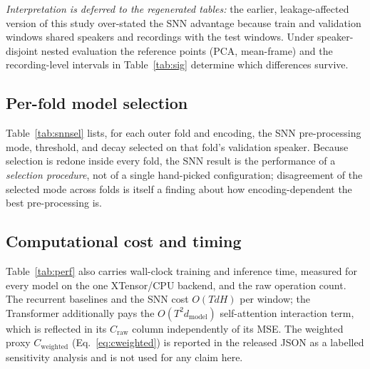\documentclass[conference]{IEEEtran}
\begin{document}
\par \emph{Interpretation is deferred to the regenerated tables:} the earlier,
leakage-affected version of this study over-stated the SNN advantage because
train and validation windows shared speakers and recordings with the test
windows. Under speaker-disjoint nested evaluation the reference points (PCA,
mean-frame) and the recording-level intervals in Table~\ref{tab:sig} determine
which differences survive.

\subsection{Per-fold model selection}
\par Table~\ref{tab:snnsel} lists, for each outer fold and encoding, the SNN
pre-processing mode, threshold, and decay selected on that fold's validation
speaker. Because selection is redone inside every fold, the SNN result is the
performance of a \emph{selection procedure}, not of a single hand-picked
configuration; disagreement of the selected mode across folds is itself a
finding about how encoding-dependent the best pre-processing is.

\subsection{Computational cost and timing}
\par Table~\ref{tab:perf} also carries wall-clock training and inference time,
measured for every model on the one XTensor/CPU backend, and the raw operation
count. The recurrent baselines and the SNN cost $O(T d H)$ per window; the
Transformer additionally pays the $O(T^2 d_{\mathrm{model}})$ self-attention
interaction term, which is reflected in its $C_{\mathrm{raw}}$ column
independently of its MSE. The weighted proxy $C_{\mathrm{weighted}}$
(Eq.~\eqref{eq:cweighted}) is reported in the released JSON as a labelled
sensitivity analysis and is not used for any claim here.
\end{document}
